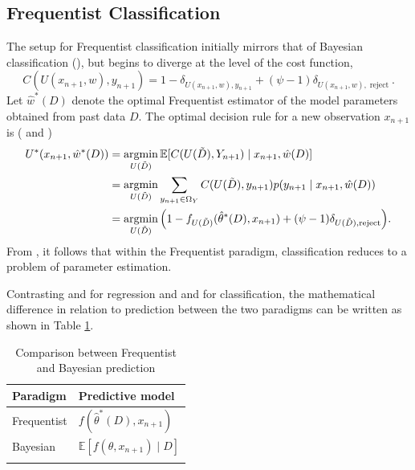 \subsection{Frequentist Classification}
\label{chp:frequentist_classification}
The setup for Frequentist classification initially mirrors that of Bayesian classification (), but begins to diverge at the level of the cost function,
\begin{equation}
	C(U(x_{n+1},w), y_{n+1}) = 1 - \delta_{U(x_{n+1},w),y_{n+1}} + (\psi-1)\delta_{U(x_{n+1},w), \operatorname{reject}}.
\end{equation}
Let $\hat{w}^*(D)$ denote the optimal Frequentist estimator of the model parameters obtained from past data $D$. The optimal decision rule for a new observation $x_{n+1}$ is ( and )
\begin{equation}
	\begin{split}
		U^*(x_{n+1}, \hat{w}^*(D)) &= \operatorname*{argmin}_{U(\tilde{D})} \mathbb{E}[C(U(\tilde{D}), Y_{n+1}) \mid x_{n+1}, \hat{w}(D)] \\
		&= \operatorname*{argmin}_{U(\tilde{D})} \sum_{y_{n+1}\in \Omega_Y}C(U(\tilde{D}),y_{n+1})p(y_{n+1}\mid x_{n+1}, \hat{w}(D)) \\
		&= \operatorname*{argmin}_{U(\tilde{D})} \Big(1 - f_{U(\tilde{D})}(\hat{\theta}^*(D), x_{n+1}) + (\psi-1)\delta_{U(\tilde{D}), \operatorname{reject}}\Big).
	\end{split}
	\label{freq:decision_classification}
\end{equation}
From , it follows that within the Frequentist paradigm, classification reduces to a problem of parameter estimation.


\begin{remark}
	Contrasting  and  for regression and  and  for classification, the mathematical difference in relation to prediction between the two paradigms can be written as shown in Table \ref{tab:comare}.
	\begin{table}[h!]
		\centering
		\caption{Comparison between Frequentist and Bayesian prediction}
		\begin{tabular}{ll}
			\toprule
			\textbf{Paradigm} & \textbf{Predictive model} \\
			\midrule
			Frequentist & $f(\hat{\theta}^*(D), x_{n+1})$ \\[3pt]
			Bayesian    & $\mathbb{E}[f(\theta, x_{n+1}) \mid D]$ \\[3pt]
			\bottomrule
			\label{tab:comare}
		\end{tabular}
	\end{table}
\end{remark}


